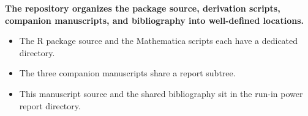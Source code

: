 \documentclass[
  11pt,
]{article}
\begin{document}
\textbf{The repository organizes the package source, derivation scripts, companion manuscripts, and bibliography into well-defined locations.}

\begin{itemize}\setlength{\itemsep}{2pt}\setlength{\parskip}{0pt}
\item The R package source and the Mathematica scripts each have a dedicated directory.
\item The three companion manuscripts share a report subtree.
\item This manuscript source and the shared bibliography sit in the run-in power report directory.
\end{itemize}
\end{document}

